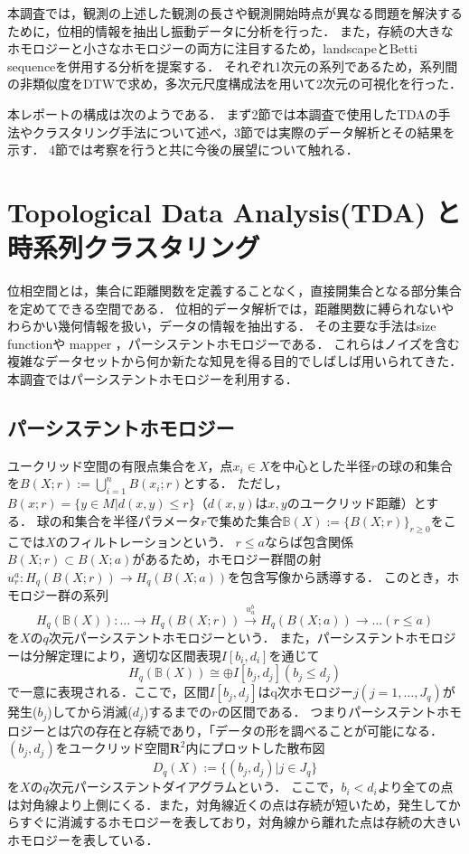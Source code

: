 \documentclass{jarticle}
\begin{document}
本調査では，観測の上述した観測の長さや観測開始時点が異なる問題を解決するために，位相的情報を抽出し振動データに分析を行った．
また，存続の大きなホモロジーと小さなホモロジーの両方に注目するため，landscapeとBetti sequenceを併用する分析を提案する．
それぞれ1次元の系列であるため，系列間の非類似度をDTWで求め，多次元尺度構成法を用いて2次元の可視化を行った．


本レポートの構成は次のようである．
まず2節では本調査で使用したTDAの手法やクラスタリング手法について述べ，3節では実際のデータ解析とその結果を示す．
4節では考察を行うと共に今後の展望について触れる．

\section{Topological Data Analysis(TDA) と時系列クラスタリング}
位相空間とは，集合に距離関数を定義することなく，直接開集合となる部分集合を定めてできる空間である．
位相的データ解析では，距離関数に縛られないやわらかい幾何情報を扱い，データの情報を抽出する．
その主要な手法はsize functionや mapper \cite{Singh2007}，パーシステントホモロジー\cite{Edelsbrunner2002}である．
これらはノイズを含む複雑なデータセットから何か新たな知見を得る目的でしばしば用いられてきた．
本調査ではパーシステントホモロジーを利用する．

\subsection{パーシステントホモロジー}
ユークリッド空間の有限点集合を$X$，点$x_i \in X$を中心とした半径$r$の球の和集合を$B(X;r):=\bigcup_{i=1}^n B(x_i;r)$とする．
ただし，$B(x;r) =\{y \in M | d(x,y) \leq r\}$（$d(x,y)$は$x,y$のユークリッド距離）とする．
球の和集合を半径パラメータ$r$で集めた集合$\mathbb B(X):=\{B(X;r)\}_{r\geq 0}$をここでは$X$のフィルトレーションという．
$r\leq a$ならば包含関係$B(X;r)\subset B(X;a)$があるため，ホモロジー群間の射$u_r^a : H_q(B(X;r))\rightarrow H_q(B(X;a)) $を包含写像から誘導する．
このとき，ホモロジー群の系列
$$
H_q(\mathbb B(X)):\dots\rightarrow H_q(B(X;r))\overset{u_a^b}{\rightarrow} H_q(B(X;a))\rightarrow\dots (r\leq a)
$$
を$X$の$q$次元パーシステントホモロジーという．
また，パーシステントホモロジーは分解定理\cite{Zomorodian2005}により，適切な区間表現$I[b_i, d_i] $を通じて
$$
H_q(\mathbb B(X))\cong\oplus I[b_j,d_j] (b_j\leq d_j)
$$
で一意に表現される．ここで，区間$I[b_j,d_j]$はq次ホモロジー$j(j=1,\dots,J_q)$が発生($b_j$)してから消滅($d_j$)するまでの$r$の区間である．
つまりパーシステントホモロジーとは穴の存在と存続であり，「データの形を調べることが可能になる．
$(b_j, d_j)$をユークリッド空間$\mathbf R^2$内にプロットした散布図
$$
D_q(X):= \{(b_j,d_j) | j \in J_q\}
$$
を$X$の$q$次元パーシステントダイアグラムという．
ここで，$b_i <  d_i$より全ての点は対角線より上側にくる．また，対角線近くの点は存続が短いため，発生してからすぐに消滅するホモロジーを表しており，対角線から離れた点は存続の大きいホモロジーを表している．
\end{document}
